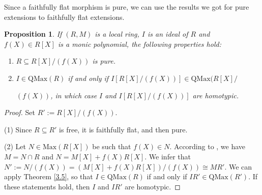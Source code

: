 \documentclass[12pt,leqno]{amsart}
\newtheorem{proposition}[theorem]{Proposition}
\theoremstyle{definition}
\begin{document}
Since a faithfully flat morphism is pure, we can use the results we got for pure extensions to faithfully flat extensions. 

\begin{proposition}\label{3.11} If $(R,M)$ is a local ring, $I$ is an ideal of $R$ and $f(X)\in R[X]$ is a monic polynomial, the following properties hold:
\begin{enumerate}
\item $R\subseteq R[X]/(f(X))$ is pure.
\item $I\in\mathrm{QMax}(R)$ if and only if $I[R[X]/(f(X))]\in\mathrm{QMax} (R[X]/$

\noindent$(f(X))$, in which case $I$ and $I[R[X]/(f(X))]$ are homotypic.
\end{enumerate} 
\end{proposition}
\begin{proof} Set $R':=R[X]/(f(X))$.

(1) Since $R\subseteq R'$ is free, it is  faithfully flat, and then pure.

(2) Let $N\in\mathrm{Max}(R[X])$ be such that $f(X)\in N$. According to  \cite[Theorem 6.9]{Pic 17}, we have $M=N\cap R$ and $N=M[X]+f(X)R[X]$. We infer that $N':=N/(f(X))=(M[X]+f(X)R[X])/(f(X))\cong MR'$. We can apply Theorem \ref{3.5}, so that $I\in\mathrm{QMax}(R)$ if and only if $IR' \in\mathrm{QMax}(R')$. If these statements hold, then $I$ and $IR'$ are homotypic.
\end{proof}
\end{document}
